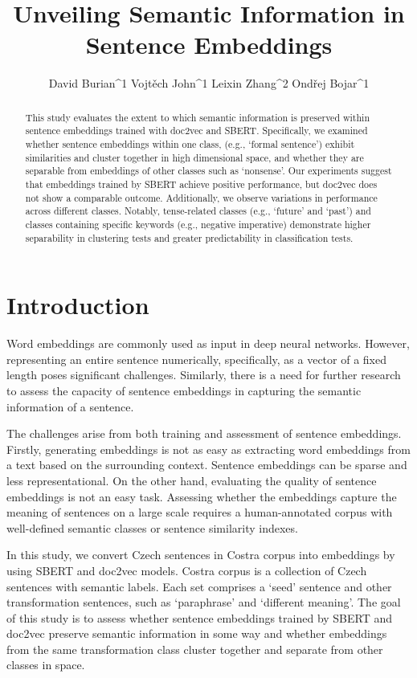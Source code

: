 \documentclass[11pt]{article}
\title{Unveiling Semantic Information in Sentence Embeddings}
\author{David Burian^1 \And Vojtěch John^1 \And Leixin Zhang^2 \And Ondřej             Bojar^1\\}
\begin{document}
\maketitle

\begin{abstract}

This study evaluates the extent to which semantic information is preserved within sentence embeddings trained with doc2vec and SBERT. 
Specifically, we examined whether sentence embeddings within one class, (e.g., `formal sentence') exhibit similarities and cluster together in high dimensional space, and whether they are separable from embeddings of other classes such as `nonsense'.  Our experiments suggest that embeddings trained by SBERT achieve positive performance, but doc2vec does not show a comparable outcome. Additionally, we observe variations in performance across different classes. Notably, tense-related classes (e.g., `future' and `past') and classes containing specific keywords (e.g., negative imperative) demonstrate higher separability in clustering tests and greater predictability in classification tests.
\end{abstract}

\section{Introduction}

Word embeddings are commonly used as input in deep neural networks. However, representing an entire sentence numerically, specifically, as a vector of a fixed length poses significant challenges. Similarly, there is a need for further research to assess the capacity of sentence embeddings in capturing the semantic information of a sentence.


The challenges arise from both training and assessment of sentence embeddings. Firstly, generating embeddings is not as easy as extracting word embeddings from a text based on the surrounding context. Sentence embeddings can be sparse and less representational. 
On the other hand, evaluating the quality of sentence embeddings is not an easy task. Assessing whether the embeddings capture the meaning of sentences on a large scale requires a human-annotated corpus with well-defined semantic classes or sentence similarity indexes.

In this study,  we convert Czech sentences in Costra corpus into embeddings by using SBERT and  doc2vec models. Costra corpus \cite{baranvcikova2020costra} is a collection of Czech sentences with semantic labels. Each set comprises a `seed' sentence  and other transformation sentences, such as `paraphrase' and `different meaning'. The goal of this study is to assess whether sentence embeddings trained by  SBERT and  doc2vec preserve semantic information in some way and whether embeddings from the same transformation class cluster together and separate from other classes in space. 
\end{document}

